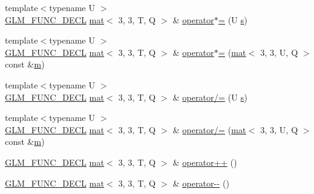 \begin{DoxyCompactItemize}
\item 
{\footnotesize template$<$typename U $>$ }\\\mbox{\hyperlink{setup_8hpp_ab2d052de21a70539923e9bcbf6e83a51}{G\+L\+M\+\_\+\+F\+U\+N\+C\+\_\+\+D\+E\+CL}} \mbox{\hyperlink{structglm_1_1mat}{mat}}$<$ 3, 3, T, Q $>$ \& \mbox{\hyperlink{structglm_1_1mat_3_013_00_013_00_01_t_00_01_q_01_4_af0528228c4f85b75447e923cebd99c2c}{operator$\ast$=}} (U \mbox{\hyperlink{_s_d_l__opengl_8h_a4af680a6c683f88ed67b76f207f2e6e4}{s}})
\item 
{\footnotesize template$<$typename U $>$ }\\\mbox{\hyperlink{setup_8hpp_ab2d052de21a70539923e9bcbf6e83a51}{G\+L\+M\+\_\+\+F\+U\+N\+C\+\_\+\+D\+E\+CL}} \mbox{\hyperlink{structglm_1_1mat}{mat}}$<$ 3, 3, T, Q $>$ \& \mbox{\hyperlink{structglm_1_1mat_3_013_00_013_00_01_t_00_01_q_01_4_adf6080b0295fc39579a981adc573dd66}{operator$\ast$=}} (\mbox{\hyperlink{structglm_1_1mat}{mat}}$<$ 3, 3, U, Q $>$ const \&\mbox{\hyperlink{_s_d_l__opengl__glext_8h_af593500c283bf1a787a6f947f503a5c2}{m}})
\item 
{\footnotesize template$<$typename U $>$ }\\\mbox{\hyperlink{setup_8hpp_ab2d052de21a70539923e9bcbf6e83a51}{G\+L\+M\+\_\+\+F\+U\+N\+C\+\_\+\+D\+E\+CL}} \mbox{\hyperlink{structglm_1_1mat}{mat}}$<$ 3, 3, T, Q $>$ \& \mbox{\hyperlink{structglm_1_1mat_3_013_00_013_00_01_t_00_01_q_01_4_a479948bc42b53782519ebebf64ff44a3}{operator/=}} (U \mbox{\hyperlink{_s_d_l__opengl_8h_a4af680a6c683f88ed67b76f207f2e6e4}{s}})
\item 
{\footnotesize template$<$typename U $>$ }\\\mbox{\hyperlink{setup_8hpp_ab2d052de21a70539923e9bcbf6e83a51}{G\+L\+M\+\_\+\+F\+U\+N\+C\+\_\+\+D\+E\+CL}} \mbox{\hyperlink{structglm_1_1mat}{mat}}$<$ 3, 3, T, Q $>$ \& \mbox{\hyperlink{structglm_1_1mat_3_013_00_013_00_01_t_00_01_q_01_4_a1ba66548bf8173db17de0de94807d918}{operator/=}} (\mbox{\hyperlink{structglm_1_1mat}{mat}}$<$ 3, 3, U, Q $>$ const \&\mbox{\hyperlink{_s_d_l__opengl__glext_8h_af593500c283bf1a787a6f947f503a5c2}{m}})
\item 
\mbox{\hyperlink{setup_8hpp_ab2d052de21a70539923e9bcbf6e83a51}{G\+L\+M\+\_\+\+F\+U\+N\+C\+\_\+\+D\+E\+CL}} \mbox{\hyperlink{structglm_1_1mat}{mat}}$<$ 3, 3, T, Q $>$ \& \mbox{\hyperlink{structglm_1_1mat_3_013_00_013_00_01_t_00_01_q_01_4_ab04f2425cf74fb2edd7fdef18e9c2201}{operator++}} ()
\item 
\mbox{\hyperlink{setup_8hpp_ab2d052de21a70539923e9bcbf6e83a51}{G\+L\+M\+\_\+\+F\+U\+N\+C\+\_\+\+D\+E\+CL}} \mbox{\hyperlink{structglm_1_1mat}{mat}}$<$ 3, 3, T, Q $>$ \& \mbox{\hyperlink{structglm_1_1mat_3_013_00_013_00_01_t_00_01_q_01_4_ae00b3ec3496cd413781d7169997f666f}{operator-\/-\/}} ()

\end{DoxyCompactItemize}

